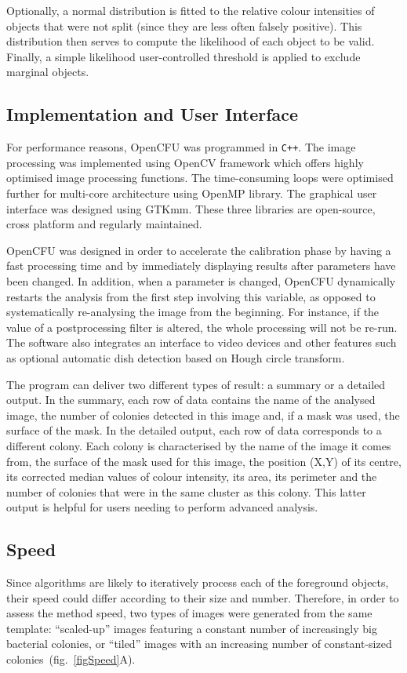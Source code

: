 \documentclass[10pt]{article}
\begin{document}
Optionally, a normal distribution is fitted to the relative colour intensities of
objects that were not split (since they are less often falsely positive). This
distribution then serves to compute the likelihood of each object to be valid.
Finally, a simple likelihood user-controlled threshold is applied to exclude
marginal objects.


 \subsection*{Implementation and User Interface} For performance reasons, OpenCFU was
programmed in \texttt{C++}. The image processing was implemented using OpenCV framework\cite{opencv_library}
 which offers highly optimised image processing functions.
The time-consuming loops were optimised further for multi-core architecture using
OpenMP library\cite{openmp11}. The graphical user interface was designed using GTKmm.
These three libraries are open-source, cross platform and regularly maintained.

OpenCFU was designed in order to accelerate the calibration phase by having a
fast processing time and by immediately displaying results after parameters have
been changed. In addition, when a parameter is changed, OpenCFU dynamically restarts the analysis from
the first step involving this variable, as opposed to systematically re-analysing the image
from 
the beginning. For instance, if the value of a postprocessing filter is altered, the whole processing will not be re-run.
The software also integrates an interface to video
devices and
other features such as optional
automatic dish detection based on Hough circle transform.


The program can deliver two different types of result: a summary or a detailed 
output. In the summary, each row of data contains
the name of the analysed image, the number of 
colonies
detected in this image and, if a mask was used, the surface of the mask.
In the detailed output, each row of data corresponds to a different colony. 
Each colony is characterised by the name of the image it comes from,
the surface of the mask used for this image,
the position (X,Y) of its centre, its corrected median values of colour intensity,
its area, its perimeter and the number of colonies that were in the same cluster 
as
this colony. This latter output is helpful for users needing
to perform advanced analysis.


\subsection*{Speed}
Since algorithms are likely to iteratively process each of the foreground
objects, their speed could differ according to their size and number.
Therefore, in order to assess the method speed,  two types of images were
generated from the same template:
``scaled-up'' images featuring a constant number of increasingly big bacterial
colonies, or ``tiled'' images with an increasing number of constant-sized
colonies~(fig.~\ref{figSpeed}A).
\end{document}
